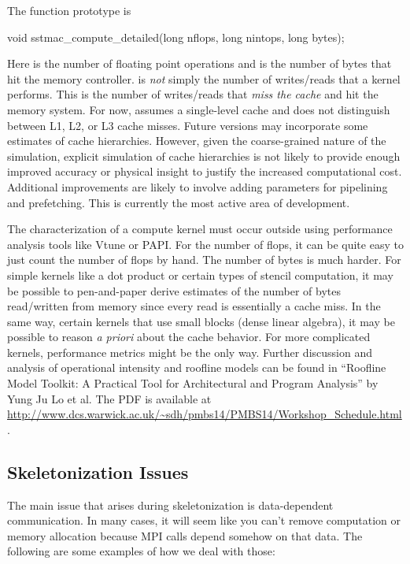 The function prototype is

\begin{CppCode}
void
sstmac_compute_detailed(long nflops, long nintops, long bytes);
\end{CppCode}
Here  is the number of floating point operations and  is the number of bytes that hit the memory controller.
 is \emph{not} simply the number of writes/reads that a kernel performs.
This is the number of writes/reads that \emph{miss the cache} and hit the memory system.
For now, \sstmacro assumes a single-level cache and does not distinguish between L1, L2, or L3 cache misses.
Future versions may incorporate some estimates of cache hierarchies.
However, given the coarse-grained nature of the simulation, explicit simulation of cache hierarchies is not likely to provide enough improved accuracy or physical insight to justify the increased computational cost. 
Additional improvements are likely to involve adding parameters for pipelining and prefetching.
This is currently the most active area of \sstmacro development.

The characterization of a compute kernel must occur outside \sstmacro using performance analysis tools like Vtune or PAPI.
For the number of flops, it can be quite easy to just count the number of flops by hand.
The number of bytes is much harder.
For simple kernels like a dot product or certain types of stencil computation, 
it may be possible to pen-and-paper derive estimates of the number of bytes read/written from memory since every read is essentially a cache miss.
In the same way, certain kernels that use small blocks (dense linear algebra), it may be possible to reason \textit{a priori} about the cache behavior.
For more complicated kernels, performance metrics might be the only way.
Further discussion and analysis of operational intensity and roofline models can be found in ``Roofline Model Toolkit: A Practical Tool for Architectural and Program Analysis'' by Yung Ju Lo et al.  The PDF is available at \url{http://www.dcs.warwick.ac.uk/~sdh/pmbs14/PMBS14/Workshop_Schedule.html}.

\subsection{Skeletonization Issues}

The main issue that arises during skeletonization is data-dependent communication.  In many cases, it will seem like you can't remove computation or memory allocation because MPI calls depend somehow on that data.  The following are some examples of how we deal with those:

